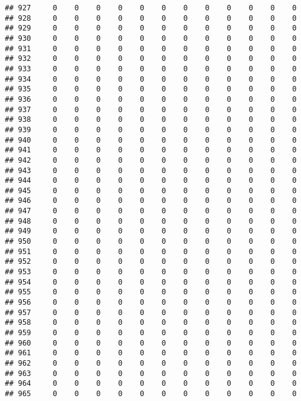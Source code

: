 \documentclass[]{article}
\begin{document}
\begin{verbatim}
## 927     0    0    0    0    0    0    0    0    0    0    0    0
## 928     0    0    0    0    0    0    0    0    0    0    0    0
## 929     0    0    0    0    0    0    0    0    0    0    0    0
## 930     0    0    0    0    0    0    0    0    0    0    0    0
## 931     0    0    0    0    0    0    0    0    0    0    0    0
## 932     0    0    0    0    0    0    0    0    0    0    0    0
## 933     0    0    0    0    0    0    0    0    0    0    0    0
## 934     0    0    0    0    0    0    0    0    0    0    0    0
## 935     0    0    0    0    0    0    0    0    0    0    0    0
## 936     0    0    0    0    0    0    0    0    0    0    0    0
## 937     0    0    0    0    0    0    0    0    0    0    0    0
## 938     0    0    0    0    0    0    0    0    0    0    0    0
## 939     0    0    0    0    0    0    0    0    0    0    0    0
## 940     0    0    0    0    0    0    0    0    0    0    0    0
## 941     0    0    0    0    0    0    0    0    0    0    0    0
## 942     0    0    0    0    0    0    0    0    0    0    0    0
## 943     0    0    0    0    0    0    0    0    0    0    0    0
## 944     0    0    0    0    0    0    0    0    0    0    0    0
## 945     0    0    0    0    0    0    0    0    0    0    0    0
## 946     0    0    0    0    0    0    0    0    0    0    0    0
## 947     0    0    0    0    0    0    0    0    0    0    0    0
## 948     0    0    0    0    0    0    0    0    0    0    0    0
## 949     0    0    0    0    0    0    0    0    0    0    0    0
## 950     0    0    0    0    0    0    0    0    0    0    0    0
## 951     0    0    0    0    0    0    0    0    0    0    0    0
## 952     0    0    0    0    0    0    0    0    0    0    0    0
## 953     0    0    0    0    0    0    0    0    0    0    0    0
## 954     0    0    0    0    0    0    0    0    0    0    0    0
## 955     0    0    0    0    0    0    0    0    0    0    0    0
## 956     0    0    0    0    0    0    0    0    0    0    0    0
## 957     0    0    0    0    0    0    0    0    0    0    0    0
## 958     0    0    0    0    0    0    0    0    0    0    0    0
## 959     0    0    0    0    0    0    0    0    0    0    0    0
## 960     0    0    0    0    0    0    0    0    0    0    0    0
## 961     0    0    0    0    0    0    0    0    0    0    0    0
## 962     0    0    0    0    0    0    0    0    0    0    0    0
## 963     0    0    0    0    0    0    0    0    0    0    0    0
## 964     0    0    0    0    0    0    0    0    0    0    0    0
## 965     0    0    0    0    0    0    0    0    0    0    0    0

\end{verbatim}
\end{document}
